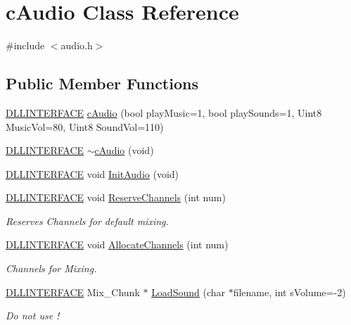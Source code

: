 \hypertarget{classc_audio}{\section{c\-Audio Class Reference}
\label{classc_audio}
}


{\ttfamily \#include $<$audio.\-h$>$}

\subsection*{Public Member Functions}
\begin{DoxyCompactItemize}
\item 
\hyperlink{_s_d_l__ep_8h_a38dd54df4631b4daf553096353d7b20b}{D\-L\-L\-I\-N\-T\-E\-R\-F\-A\-C\-E} \hyperlink{classc_audio_ae55545da86ba39c8542872d7f7c47cf3}{c\-Audio} (bool play\-Music=1, bool play\-Sounds=1, Uint8 Music\-Vol=80, Uint8 Sound\-Vol=110)
\item 
\hyperlink{_s_d_l__ep_8h_a38dd54df4631b4daf553096353d7b20b}{D\-L\-L\-I\-N\-T\-E\-R\-F\-A\-C\-E} \hyperlink{classc_audio_ace24f99e655a32bf8e8b7ce535a5e12a}{$\sim$c\-Audio} (void)
\item 
\hyperlink{_s_d_l__ep_8h_a38dd54df4631b4daf553096353d7b20b}{D\-L\-L\-I\-N\-T\-E\-R\-F\-A\-C\-E} void \hyperlink{classc_audio_a061b99482e902ad4120ac4026851b0ba}{Init\-Audio} (void)
\item 
\hyperlink{_s_d_l__ep_8h_a38dd54df4631b4daf553096353d7b20b}{D\-L\-L\-I\-N\-T\-E\-R\-F\-A\-C\-E} void \hyperlink{classc_audio_ac8510e608478447a6b5351edbada1bbe}{Reserve\-Channels} (int num)
\begin{DoxyCompactList}\small\item\em Reserves Channels for default mixing. \end{DoxyCompactList}\item 
\hyperlink{_s_d_l__ep_8h_a38dd54df4631b4daf553096353d7b20b}{D\-L\-L\-I\-N\-T\-E\-R\-F\-A\-C\-E} void \hyperlink{classc_audio_ad3d70862dd8600834166a66408b00831}{Allocate\-Channels} (int num)
\begin{DoxyCompactList}\small\item\em Channels for Mixing. \end{DoxyCompactList}\item 
\hyperlink{_s_d_l__ep_8h_a38dd54df4631b4daf553096353d7b20b}{D\-L\-L\-I\-N\-T\-E\-R\-F\-A\-C\-E} Mix\-\_\-\-Chunk $\ast$ \hyperlink{classc_audio_a6b544ca3a10032eed651d8d4326d5bfa}{Load\-Sound} (char $\ast$filename, int s\-Volume=-\/2)
\begin{DoxyCompactList}\small\item\em Do not use ! \end{DoxyCompactList}\item 

\end{DoxyCompactItemize}
